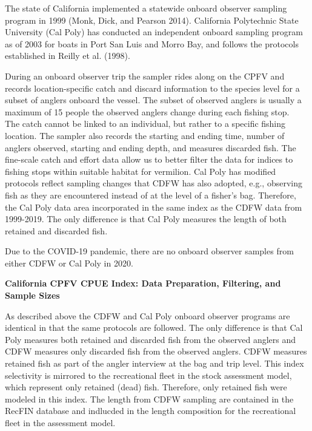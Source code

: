 \documentclass[11pt,
  english,
  a4paper,
]{article}
\begin{document}
\leavevmode\tagmcend\tagstructend

The state of California implemented a statewide onboard observer sampling program in 1999 {(Monk, Dick, and Pearson 2014)\leavevmode\tagmcend\tagstructend}. California Polytechnic State University (Cal Poly) has conducted an independent onboard sampling program as of 2003 for boats in Port San Luis and Morro Bay, and follows the protocols established in Reilly et al. {(1998)\leavevmode\tagmcend\tagstructend}.

During an onboard observer trip the sampler rides along on the CPFV and records location-specific catch and discard information to the species level for a subset of anglers onboard the vessel. The subset of observed anglers is usually a maximum of 15 people the observed anglers change during each fishing stop.\\
The catch cannot be linked to an individual, but rather to a specific fishing location. The sampler also records the starting and ending time, number of anglers observed, starting and ending depth, and measures discarded fish. The fine-scale catch and effort data allow us to better filter the data for indices to fishing stops within suitable habitat for vermilion. Cal Poly has modified protocols reflect sampling changes that CDFW has also adopted, e.g., observing fish as they are encountered instead of at the level of a fisher's bag. Therefore, the Cal Poly data area incorporated in the same index as the CDFW data from 1999-2019. The only difference is that Cal Poly measures the length of both retained and discarded fish.

Due to the COVID-19 pandemic, there are no onboard observer samples from either CDFW or Cal Poly in 2020.

\textbf{California CPFV CPUE Index: Data Preparation, Filtering, and Sample Sizes}

As described above the CDFW and Cal Poly onboard observer programs are identical in that the same protocols are followed. The only difference is that Cal Poly measures both retained and discarded fish from the observed anglers and CDFW measures only discarded fish from the observed anglers. CDFW measures retained fish as part of the angler interview at the bag and trip level. This index selectivity is mirrored to the recreational fleet in the stock assessment model, which represent only retained (dead) fish. Therefore, only retained fish were modeled in this index. The length from CDFW sampling are contained in the RecFIN database and indlucded in the length composition for the recreational fleet in the assessment model.
\end{document}
